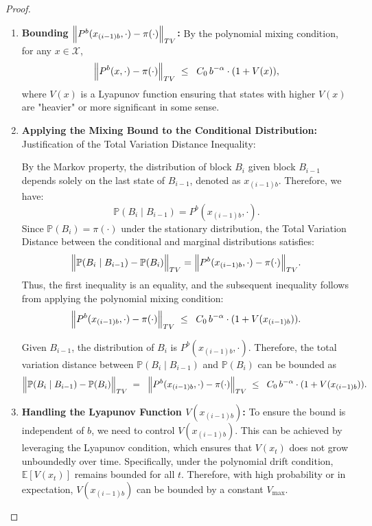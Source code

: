 \begin{proof}
\begin{enumerate}
  \item \textbf{Bounding \( \Bigl\| P^b(x_{(i-1)b}, \cdot) - \pi(\cdot) \Bigr\|_{TV} \):}  
    By the polynomial mixing condition, for any \( x \in \mathcal{X} \),
    \[
      \Bigl\| P^b(x, \cdot) - \pi(\cdot) \Bigr\|_{TV}
      \;\le\;\;
      C_0\,b^{-\alpha} \cdot (1 + V(x)),
    \]
    where \( V(x) \) is a Lyapunov function ensuring that states with higher \( V(x) \) are "heavier" or more significant in some sense.

  \item \textbf{Applying the Mixing Bound to the Conditional Distribution:}  
  {Justification of the Total Variation Distance Inequality:}

By the Markov property, the distribution of block \( B_i \) given block \( B_{i-1} \) depends solely on the last state of \( B_{i-1} \), denoted as \( x_{(i-1)b} \). Therefore, we have:
\[
  \mathbb{P}(B_i \mid B_{i-1}) = P^b(x_{(i-1)b}, \cdot).
\]
Since \( \mathbb{P}(B_i) = \pi(\cdot) \) under the stationary distribution, the Total Variation Distance between the conditional and marginal distributions satisfies:
\[
  \Bigl\| \mathbb{P}(B_i \mid B_{i-1}) - \mathbb{P}(B_i) \Bigr\|_{TV}
  = \Bigl\| P^b(x_{(i-1)b}, \cdot) - \pi(\cdot) \Bigr\|_{TV}.
\]
Thus, the first inequality is an equality, and the subsequent inequality follows from applying the polynomial mixing condition:
\[
  \Bigl\| P^b(x_{(i-1)b}, \cdot) - \pi(\cdot) \Bigr\|_{TV}
  \;\le\;\;
  C_0\,b^{-\alpha} \cdot (1 + V(x_{(i-1)b})).
\]

    Given \( B_{i-1} \), the distribution of \( B_i \) is \( P^b(x_{(i-1)b}, \cdot) \). Therefore, the total variation distance between \( \mathbb{P}(B_i \mid B_{i-1}) \) and \( \mathbb{P}(B_i) \) can be bounded as
    \[
      \Bigl\| \mathbb{P}(B_i \mid B_{i-1}) - \mathbb{P}(B_i) \Bigr\|_{TV}
      \;=\;\;
      \Bigl\| P^b(x_{(i-1)b}, \cdot) - \pi(\cdot) \Bigr\|_{TV}
      \;\le\;\;
      C_0\,b^{-\alpha} \cdot (1 + V(x_{(i-1)b})).
    \]

    

  \item \textbf{Handling the Lyapunov Function \( V(x_{(i-1)b}) \):}  
    To ensure the bound is independent of \( b \), we need to control \( V(x_{(i-1)b}) \). This can be achieved by leveraging the Lyapunov condition, which ensures that \( V(x_t) \) does not grow unboundedly over time. Specifically, under the polynomial drift condition, \( \mathbb{E}[V(x_t)] \) remains bounded for all \( t \). Therefore, with high probability or in expectation, \( V(x_{(i-1)b}) \) can be bounded by a constant \( V_{\max} \).


\end{enumerate}
\end{proof}
